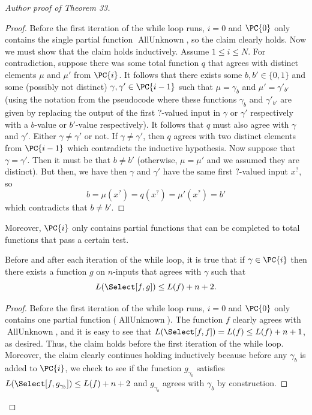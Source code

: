 \begin{proof}[Author proof of Theorem 33]
\begin{ntclaim}
\end{ntclaim}
\begin{proof}
Before the first iteration of the while loop runs, $i=0$ and $\PC{0}$ only contains the single partial function $\operatorname{AllUnknown}$, so the claim clearly holds.
Now we must show that the claim holds inductively. Assume $1\leq i\leq N$. For contradiction, suppose there was some total function $q$ that agrees with distinct elements $\mu$ and $\mu'$ from $\PC{i}$. It follows that there exists some $b,b'\in\{0,1\}$ and some (possibly not distinct) $\gamma,\gamma'\in\PC{i-1}$ such that $\mu=\gamma_b$ and $\mu'=\gamma'_{b'}$ (using the notation from the pseudocode where these functions $\gamma_b$ and $\gamma'_{b'}$ are given by replacing the output of the first $?$-valued input in $\gamma$ or $\gamma'$ respectively with a $b$-value or $b'$-value respectively). It follows that $q$ must also agree with $\gamma$ and $\gamma'$.
Either $\gamma\ne\gamma'$ or not. If $\gamma\ne\gamma'$, then $q$ agrees with two distinct elements from $\PC{i-1}$ which contradicts the inductive hypothesis.
Now suppose that $\gamma=\gamma'$. Then it must be that $b\ne b'$ (otherwise, $\mu=\mu'$ and we assumed they are distinct). But then, we have then $\gamma$ and $\gamma'$ have the same first $?$-valued input $x^?$, so
\[b=\mu(x^?)=q(x^?)=\mu'(x^?)=b'\]
which contradicts that $b\ne b'$.
\end{proof}
Moreover, $\PC{i}$ only contains partial functions that can be completed to total functions that pass a certain test.
\begin{ntclaim}
Before and after each iteration of the while loop, it is true that if $\gamma\in\PC{i}$ then there exists a function $g$ on $n$-inputs that agrees with $\gamma$ such that
\[L(\Select[f,g])\leq L(f)+n+2.\]
\end{ntclaim}
\begin{proof}
Before the first iteration of the while loop runs, $i=0$ and $\PC{0}$ only contains one partial function ($\operatorname{AllUnknown}$). The function $f$ clearly agrees with $\operatorname{AllUnknown}$, and it is easy to see that $L(\Select[f,f])=L(f)\leq L(f)+n+1$, as desired. Thus, the claim holds before the first iteration of the while loop.
Moreover, the claim clearly continues holding inductively because before any $\gamma_b$ is added to $\PC{i}$, we check to see if the function $g_{\gamma_b}$ satisfies $L(\Select[f,g_{\gamma_b}])\leq L(f)+n+2$ and $g_{\gamma_b}$ agrees with $\gamma_b$ by construction.
\end{proof}

\end{proof}
